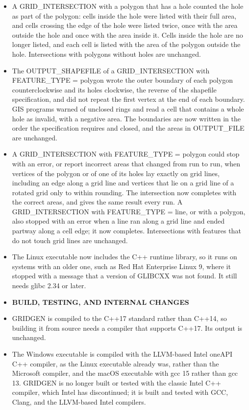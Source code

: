 \begin{itemize}[label=--]
  \item A GRID\_INTERSECTION with a polygon that has a hole counted the hole as part of the polygon: cells inside the hole were listed with their full area, and cells crossing the edge of the hole were listed twice, once with the area outside the hole and once with the area inside it. Cells inside the hole are no longer listed, and each cell is listed with the area of the polygon outside the hole. Intersections with polygons without holes are unchanged.
  \item The OUTPUT\_SHAPEFILE of a GRID\_INTERSECTION with FEATURE\_TYPE = polygon wrote the outer boundary of each polygon counterclockwise and its holes clockwise, the reverse of the shapefile specification, and did not repeat the first vertex at the end of each boundary. GIS programs warned of unclosed rings and read a cell that contains a whole hole as invalid, with a negative area. The boundaries are now written in the order the specification requires and closed, and the areas in OUTPUT\_FILE are unchanged.
  \item A GRID\_INTERSECTION with FEATURE\_TYPE = polygon could stop with an error, or report incorrect areas that changed from run to run, when vertices of the polygon or of one of its holes lay exactly on grid lines, including an edge along a grid line and vertices that lie on a grid line of a rotated grid only to within rounding. The intersection now completes with the correct areas, and gives the same result every run. A GRID\_INTERSECTION with FEATURE\_TYPE = line, or with a polygon, also stopped with an error when a line ran along a grid line and ended partway along a cell edge; it now completes. Intersections with features that do not touch grid lines are unchanged.
  \item The Linux executable now includes the C++ runtime library, so it runs on systems with an older one, such as Red Hat Enterprise Linux 9, where it stopped with a message that a version of GLIBCXX was not found. It still needs glibc 2.34 or later.
  \item[] \textbf{BUILD, TESTING, AND INTERNAL CHANGES}
  \item GRIDGEN is compiled to the C++17 standard rather than C++14, so building it from source needs a compiler that supports C++17. Its output is unchanged.
  \item The Windows executable is compiled with the LLVM-based Intel oneAPI C++ compiler, as the Linux executable already was, rather than the Microsoft compiler, and the macOS executable with gcc 15 rather than gcc 13. GRIDGEN is no longer built or tested with the classic Intel C++ compiler, which Intel has discontinued; it is built and tested with GCC, Clang, and the LLVM-based Intel compilers.

\end{itemize}
